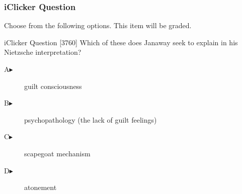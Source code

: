 \documentclass[xcolor=dvipsnames]{beamer}
\begin{document}
\begin{frame}
  \frametitle{iClicker Question}
Choose from the following options. This item will be graded.
\begin{block}{iClicker Question}
[3760] Which of these does Janaway seek to explain in his Nietzsche interpretation?
\end{block}
\begin{description}
\item[A\hspace{.2in}$\blacktriangleright$] guilt consciousness
\item[B\hspace{.2in}$\blacktriangleright$] psychopathology (the lack of guilt feelings)
\item[C\hspace{.2in}$\blacktriangleright$] scapegoat mechanism
\item[D\hspace{.2in}$\blacktriangleright$] atonement
\end{description}
\end{frame}
\end{document}

